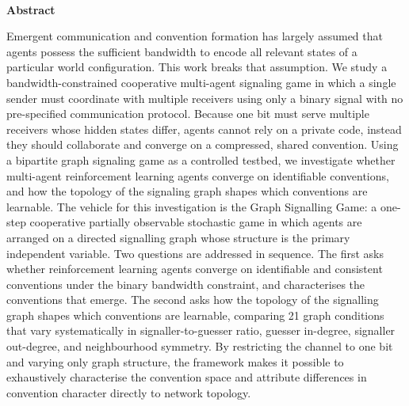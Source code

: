 \documentclass[a4paper,twoside,12pt]{report}
\renewenvironment{abstract}{\ \vfill\begin{center}\textbf{Abstract}\end{center}\addcontentsline{toc}{section}{Abstract}}{\vfill\vfill\newpage}
\begin{document}
    \begin{abstract}
    Emergent communication and convention formation has largely assumed that agents possess the sufficient bandwidth to encode all relevant states of a particular world configuration. This work breaks that assumption. We study a bandwidth-constrained cooperative multi-agent signaling game in which a single sender must coordinate with multiple receivers using only a binary signal with no pre-specified communication protocol. Because one bit must serve multiple receivers whose hidden states differ, agents cannot rely on a private code, instead they should collaborate and converge on a compressed, shared convention. Using a bipartite graph signaling game as a controlled testbed, we investigate whether multi-agent reinforcement learning agents converge on identifiable conventions, and how the topology of the signaling graph shapes which conventions are learnable. The vehicle for this investigation is the Graph Signalling Game: a one-step cooperative partially observable stochastic game in which agents
    are arranged on a directed signalling graph whose structure is the primary
    independent variable. Two questions are addressed in sequence. The first
    asks whether reinforcement learning agents converge on identifiable and
    consistent conventions under the binary bandwidth constraint, and
    characterises the conventions that emerge. The second asks how
    the topology of the signalling graph shapes which conventions are learnable, comparing 21 graph conditions that vary systematically in signaller-to-guesser ratio, guesser in-degree, signaller out-degree, and neighbourhood symmetry. By restricting the channel to one bit and varying only graph structure, the framework makes it possible to exhaustively characterise the convention space and attribute differences in convention character directly to network topology.
    
    
    \end{abstract}
    
\end{document}
